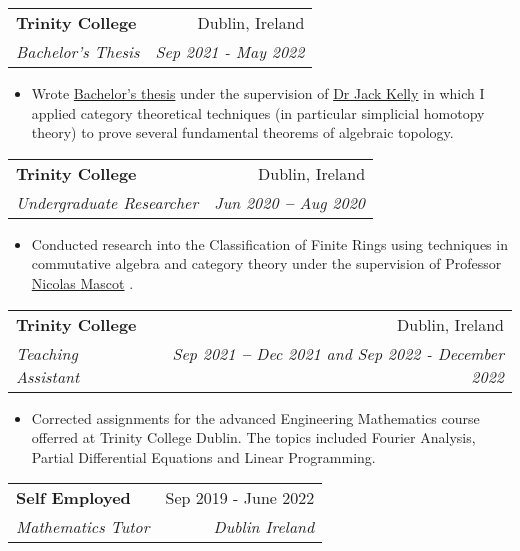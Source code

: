 \documentclass[letterpaper,11pt]{article}
\makeatletter
\newcommand{\resumeItem}[1]{
  \item\small{
    {#1 \vspace{-2pt}}
  }
}
\newcommand{\resumeSubheading}[4]{
  \vspace{-2pt}\item
    \begin{tabular*}{0.97\textwidth}[t]{l@{\extracolsep{\fill}}r}
      \textbf{#1} & #2 \\
      \textit{\small#3} & \textit{\small #4} \\
    \end{tabular*}\vspace{-7pt}
}
\newcommand{\resumeItemListStart}{\begin{itemize}}
\newcommand{\resumeItemListEnd}{\end{itemize}\vspace{-5pt}}
\makeatother
\begin{document}
	\resumeSubheading
	{Trinity College}{Dublin, Ireland}
	{Bachelor's Thesis}{Sep 2021 - May 2022}
	\resumeItemListStart
\resumeItem{Wrote \href{https://github.com/sam-laing/bachelor-thesis/blob/main/diss.pdf}{Bachelor's thesis} under the supervision of \href{https://www.maths.tcd.ie/people/kellyj/}{Dr Jack Kelly} in which I applied category theoretical techniques (in particular simplicial homotopy theory) to prove several fundamental theorems of algebraic topology.}



	\resumeItemListEnd

    \resumeSubheading
      {Trinity College}{Dublin, Ireland}
      {Undergraduate Researcher}{Jun 2020 \textbf{--} Aug 2020}
        \resumeItemListStart
	\resumeItem{Conducted research into the Classification of Finite Rings using techniques in commutative algebra and category theory under the supervision of Professor \href{https://www.maths.tcd.ie/~mascotn/}{Nicolas Mascot} .}
        \resumeItemListEnd


    \resumeSubheading
      {Trinity College}{Dublin, Ireland}
      {Teaching Assistant}{Sep 2021 \textbf{--} Dec 2021 and Sep 2022 - December 2022}
        \resumeItemListStart
	\resumeItem{Corrected assignments for the advanced Engineering Mathematics course offerred at Trinity College Dublin. The topics included Fourier Analysis, Partial Differential Equations and Linear Programming.}
        \resumeItemListEnd
	\resumeSubheading
	{Self Employed}{Sep 2019 - June 2022}
	{Mathematics Tutor}{Dublin Ireland}
    
\end{document}
